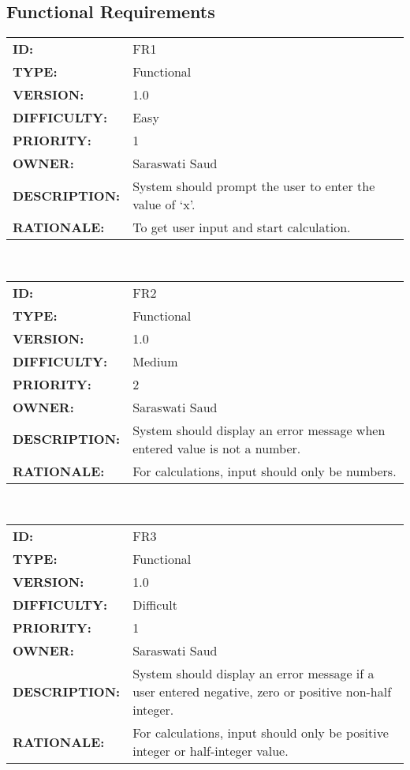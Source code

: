         \subsection{Functional Requirements}
        \begin{tabular}{ |p{4cm} | p{11cm}| }
            \hline
            \textbf{ID:} & FR1\\
            \textbf{TYPE:} & Functional\\
            \textbf{VERSION:} & 1.0\\
            \textbf{DIFFICULTY:} & Easy\\
            \textbf{PRIORITY:} & 1\\
            \textbf{OWNER:} & Saraswati Saud\\
            \textbf{DESCRIPTION:} & System should prompt the user to enter the value of ‘x’. \\
            \textbf{RATIONALE:} & To get user input and start calculation. \\
            \hline
        \end{tabular}
        \\[10pt]
        \begin{tabular}{ |p{4cm} | p{11cm}| }
            \hline
            \textbf{ID:} & FR2\\
            \textbf{TYPE:} & Functional\\
            \textbf{VERSION:} & 1.0\\
            \textbf{DIFFICULTY:} & Medium\\
            \textbf{PRIORITY:} & 2\\
            \textbf{OWNER:} & Saraswati Saud\\
            \textbf{DESCRIPTION:} & System should display an error message when entered value is not   a number. \\
            \textbf{RATIONALE:} & For calculations, input should only be numbers. \\
            \hline
        \end{tabular}
        \\[10pt]
        \begin{tabular}{ |p{4cm} | p{11cm}| }
            \hline
            \textbf{ID:} & FR3\\
            \textbf{TYPE:} & Functional\\
            \textbf{VERSION:} & 1.0\\
            \textbf{DIFFICULTY:} & Difficult\\
            \textbf{PRIORITY:} & 1\\
            \textbf{OWNER:} & Saraswati Saud\\
            \textbf{DESCRIPTION:} & System should display an error message if a user entered negative, zero or positive non-half integer. \\
            \textbf{RATIONALE:} & For calculations, input should only be positive integer or half-integer value. \\
            \hline
        \end{tabular}
